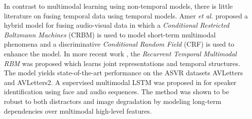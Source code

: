\documentclass[10pt,twocolumn,letterpaper]{article}
\begin{document}
In contrast to multimodal learning using non-temporal models, there is little literature on fusing temporal data using temporal models. Amer \textit{et al.} \cite{amer2014multimodal} proposed a hybrid model for fusing audio-visual data in which a \textit{Conditional Restricted Boltzmann Machines} (CRBM) is used to model short-term multimodal phenomena and a discriminative \textit{Conditional Random Field} (CRF) is used to enhance the model. In more recent work \cite{hu2016temporal}, the \textit{Recurrent Temporal Multimodal RBM} was proposed which learns joint representations and temporal structures. The model yields state-of-the-art performance on the ASVR datasets AVLetters and AVLetters2. A supervised multimodal LSTM was proposed in \cite{ren2016look} for speaker identification using face and audio sequences. The method was shown to be robust to both distractors and image degradation by modeling long-term dependencies over multimodal high-level features.


\end{document}
